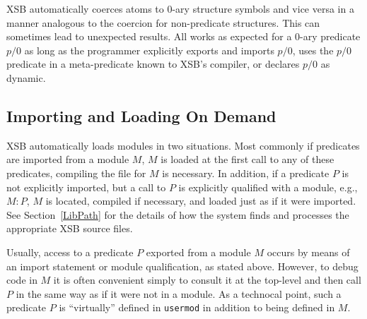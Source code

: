 XSB automatically coerces atoms to 0-ary structure symbols and vice
versa in a manner analogous to the coercion for non-predicate
structures.
This can sometimes lead to unexpected results.  All works as expected
for a 0-ary predicate $p/0$ as long as the programmer explicitly
exports and imports $p/0$, uses the $p/0$ predicate in a
meta-predicate known to XSB's compiler, or declares $p/0$ as dynamic.

\subsection{Importing and Loading On Demand} 

XSB automatically loads modules in two situations.  Most commonly if
predicates are imported from a module $M$, $M$ is loaded at the first
call to any of these predicates, compiling the file for $M$ is
necessary.  In addition, if a predicate $P$ is not explicitly
imported, but a call to $P$ is explicitly qualified with a module,
e.g., $M:P$, $M$ is located, compiled if necessary, and loaded just as
if it were imported.  See Section~\ref{LibPath} for the details of how
the system finds and processes the appropriate XSB source files.

Usually, access to a predicate $P$ exported from a module $M$ occurs
by means of an import statement or module qualification, as stated
above.  However, to debug code in $M$ it is often convenient simply to
consult it at the top-level and then call $P$ in the same way as if it
were not in a module.
As a technocal point, such a predicate $P$ is ``virtually'' defined in
{\tt usermod} in addition to being defined in $M$.

